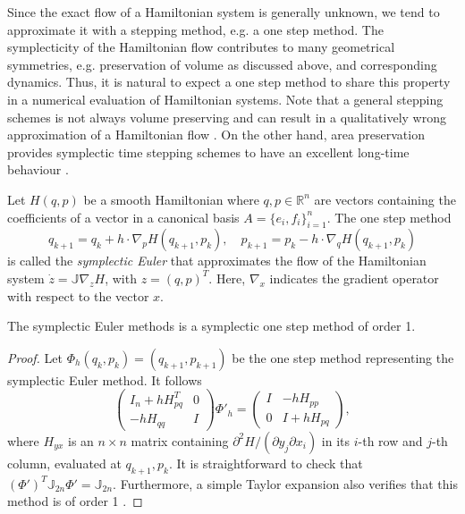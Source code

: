 Since the exact flow of a Hamiltonian system is generally unknown, we tend to approximate it with a stepping method, e.g. a one step method. The symplecticity of the Hamiltonian flow contributes to many geometrical symmetries, e.g. preservation of volume as discussed above, and corresponding dynamics. Thus, it is natural to expect a one step method to share this property in a numerical evaluation of Hamiltonian systems. Note that a general stepping schemes is not always volume preserving and can result in a qualitatively wrong approximation of a Hamiltonian flow \cite{hairer2006geometric}. On the other hand, area preservation provides symplectic time stepping schemes to have an excellent long-time behaviour \cite{hairer2006geometric,blanes2016concise}.

\begin{definition}
Let $H(q,p)$ be a smooth Hamiltonian where $q,p\in\mathbb R^{n}$ are vectors containing the coefficients of a vector in a canonical basis $A = \{ e_i,f_i\}_{i=1}^n$. The one step method
\begin{equation}
	q_{k+1} = q_k + h \cdot \nabla_p H(q_{k+1},p_k),\quad p_{k+1} = p_k - h \cdot \nabla_q H(q_{k+1},p_k)
\end{equation}
is called the \emph{symplectic Euler} that approximates the flow of the Hamiltonian system $\dot z = \mathbb J \nabla_z H$, with $z=(q,p)^T$. Here, $\nabla_x$ indicates the gradient operator with respect to the vector $x$.
\end{definition}

\begin{theorem} \cite{hairer2006geometric}
The symplectic Euler methods is a symplectic one step method of order 1.
\end{theorem}
\begin{proof}
Let $\Phi_h(q_k,p_k) = (q_{k+1},p_{k+1})$ be the one step method representing the symplectic Euler method. It follows
\begin{equation*}
	\begin{pmatrix}
		I_n + h H_{pq}^T & 0 \\
		-hH_{qq} & I	
	\end{pmatrix}
	\Phi'_h = 
	\begin{pmatrix}
		I & -h H_{pp} \\
		0 & I+ h H_{pq}
	\end{pmatrix},
\end{equation*}
where $H_{yx}$ is an $n\times n$ matrix containing ${\partial^2 H }/{(\partial y_j \partial x_i)}$ in its $i$-th row and $j$-th column, evaluated at $q_{k+1},p_k$. It is straightforward to check that $(\Phi')^T \mathbb J_{2n} \Phi' = \mathbb J_{2n}$. Furthermore, a simple Taylor expansion also verifies that this method is of order 1 \cite{hairer2006geometric}.
\end{proof}

